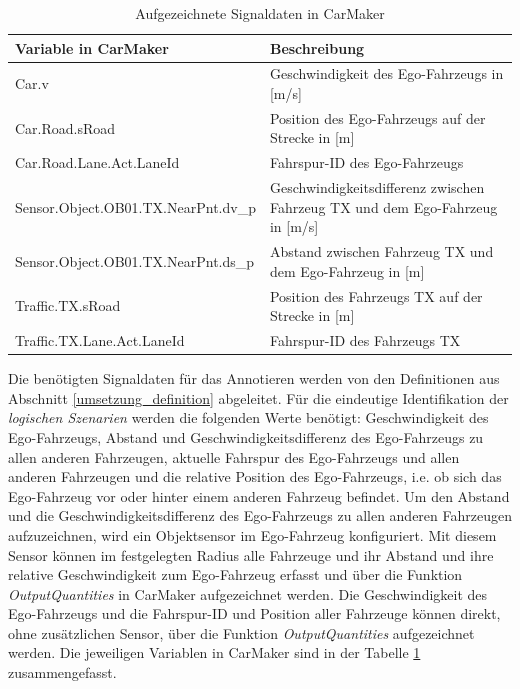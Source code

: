 \begin{table}[h]
\centering
\def\arraystretch{1.4}
\begin{tabular}{p{7cm} p{6.8cm}}
\textbf{Variable in CarMaker} & \textbf{Beschreibung} \\
\hline

Car.v & Geschwindigkeit des Ego-Fahrzeugs in [m/s] \\
Car.Road.sRoad & Position des Ego-Fahrzeugs auf der Strecke in [m] \\
Car.Road.Lane.Act.LaneId & Fahrspur-ID des Ego-Fahrzeugs \\
\hline
Sensor.Object.OB01.TX.NearPnt.dv\_p & Geschwindigkeitsdifferenz zwischen Fahrzeug TX und dem Ego-Fahrzeug in [m/s] \\
Sensor.Object.OB01.TX.NearPnt.ds\_p & Abstand zwischen Fahrzeug TX und dem Ego-Fahrzeug in [m] \\
\hline
Traffic.TX.sRoad & Position des Fahrzeugs TX auf der Strecke in [m] \\
Traffic.TX.Lane.Act.LaneId & Fahrspur-ID des Fahrzeugs TX \\
\hline

\end{tabular}
\caption{Aufgezeichnete Signaldaten in CarMaker}
\label{tab_output_quantities}
\end{table}

Die benötigten Signaldaten für das Annotieren werden von den Definitionen aus Abschnitt \ref{umsetzung_definition} abgeleitet. Für die eindeutige Identifikation der \textit{logischen Szenarien} werden die folgenden Werte benötigt: Geschwindigkeit des Ego-Fahrzeugs, Abstand und Geschwindigkeitsdifferenz des Ego-Fahrzeugs zu allen anderen Fahrzeugen, aktuelle Fahrspur des Ego-Fahrzeugs und allen anderen Fahrzeugen und die relative Position des Ego-Fahrzeugs, i.e. ob sich das Ego-Fahrzeug vor oder hinter einem anderen Fahrzeug befindet. Um den Abstand und die Geschwindigkeitsdifferenz des Ego-Fahrzeugs zu allen anderen Fahrzeugen aufzuzeichnen, wird ein Objektsensor im Ego-Fahrzeug konfiguriert. Mit diesem Sensor können im festgelegten Radius alle Fahrzeuge und ihr Abstand und ihre relative Geschwindigkeit zum Ego-Fahrzeug erfasst und über die Funktion \textit{OutputQuantities} in CarMaker aufgezeichnet werden. Die Geschwindigkeit des Ego-Fahrzeugs und die Fahrspur-ID und Position aller Fahrzeuge können direkt, ohne zusätzlichen Sensor, über die Funktion \textit{OutputQuantities} aufgezeichnet werden. Die jeweiligen Variablen in CarMaker sind in der Tabelle \ref{tab_output_quantities} zusammengefasst.


